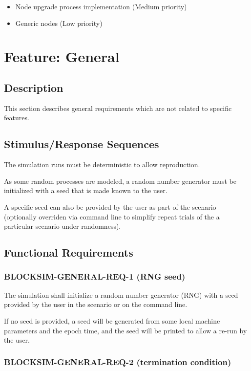 \documentclass{scrreprt}
\begin{document}
\begin{itemize}
   \item Node upgrade process implementation (Medium priority)
   \item Generic nodes (Low priority)
\end{itemize}


\section{Feature: General}

\subsection{Description}

This section describes general requirements which are not related to
specific features.


\subsection{Stimulus/Response Sequences}

The simulation runs must be deterministic to allow reproduction.

As some random processes are modeled, a random number generator must be
initialized with a seed that is made known to the user.

A specific seed can also be provided by the user as part of the scenario
(optionally overriden via command line to simplify repeat trials of the
a particular scenario under randomness).


\subsection{Functional Requirements}


\subsubsection{BLOCKSIM-GENERAL-REQ-1 (RNG seed)}

The simulation shall initialize a random number generator (RNG) with a seed
provided by the user in the scenario or on the command line.

If no seed is provided, a seed will be generated from some local machine
parameters and the epoch time, and the seed will be printed to allow
a re-run by the user.

\subsubsection{BLOCKSIM-GENERAL-REQ-2 (termination condition)}
\end{document}

